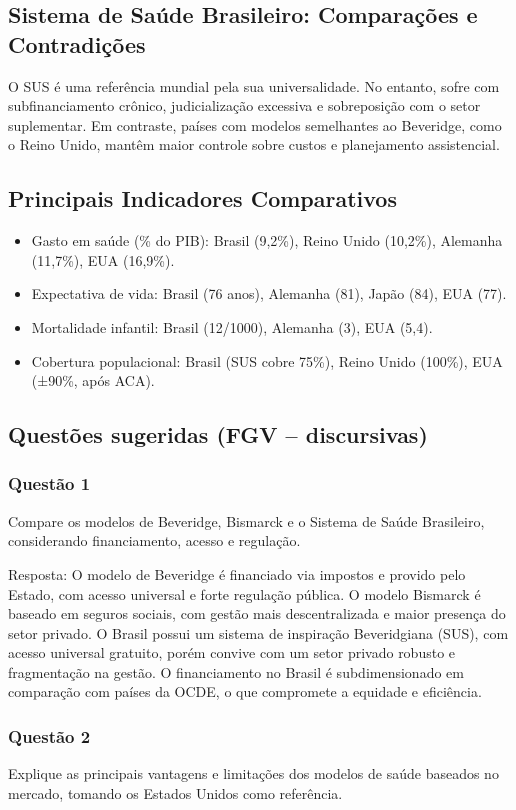 \documentclass[a4paper,12pt]{article}
\begin{document}
\subsection{Sistema de Saúde Brasileiro: Comparações e Contradições}
\label{sec:org5b6c922}
O SUS é uma referência mundial pela sua universalidade. No entanto, sofre com subfinanciamento crônico, judicialização excessiva e sobreposição com o setor suplementar. Em contraste, países com modelos semelhantes ao Beveridge, como o Reino Unido, mantêm maior controle sobre custos e planejamento assistencial.
\subsection{Principais Indicadores Comparativos}
\label{sec:orgc8c1239}
\begin{itemize}
\item Gasto em saúde (\% do PIB): Brasil (9,2\%), Reino Unido (10,2\%), Alemanha (11,7\%), EUA (16,9\%).
\item Expectativa de vida: Brasil (76 anos), Alemanha (81), Japão (84), EUA (77).
\item Mortalidade infantil: Brasil (12/1000), Alemanha (3), EUA (5,4).
\item Cobertura populacional: Brasil (SUS cobre 75\%), Reino Unido (100\%), EUA (±90\%, após ACA).
\end{itemize}
\subsection{Questões sugeridas (FGV – discursivas)}
\label{sec:orgf073cbd}

\subsubsection{Questão 1}
\label{sec:org873941f}
Compare os modelos de Beveridge, Bismarck e o Sistema de Saúde Brasileiro, considerando financiamento, acesso e regulação.

Resposta:
O modelo de Beveridge é financiado via impostos e provido pelo Estado, com acesso universal e forte regulação pública. O modelo Bismarck é baseado em seguros sociais, com gestão mais descentralizada e maior presença do setor privado. O Brasil possui um sistema de inspiração Beveridgiana (SUS), com acesso universal gratuito, porém convive com um setor privado robusto e fragmentação na gestão. O financiamento no Brasil é subdimensionado em comparação com países da OCDE, o que compromete a equidade e eficiência.
\subsubsection{Questão 2}
\label{sec:org24b0f38}
Explique as principais vantagens e limitações dos modelos de saúde baseados no mercado, tomando os Estados Unidos como referência.
\end{document}
